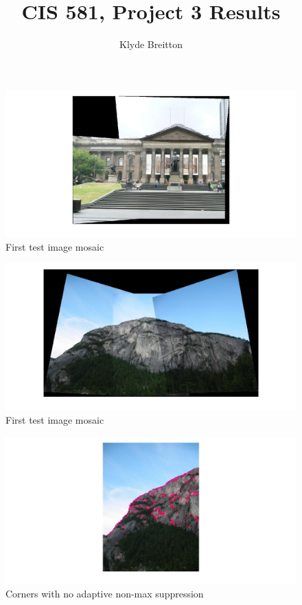 \documentclass[english]{article}
\title{CIS 581, Project 3 Results \\}
\author{Klyde Breitton}
\begin{document}
    
\begin{figure}[h!]
    \includegraphics[width=1\textwidth]{test1}
    \caption{First test image mosaic}
    \label{fig:test1}
  \end{figure} 
   
  \begin{figure}[h!]
      \includegraphics[width=1\textwidth]{test2}
      \caption{First test image mosaic}
      \label{fig:test1}
    \end{figure}  
    
  \begin{figure}[h!]
      \includegraphics[width=1\textwidth]{nonanms1}
      \caption{Corners with no adaptive non-max suppression}
      \label{fig:test1}
    \end{figure}
     
\end{document}
